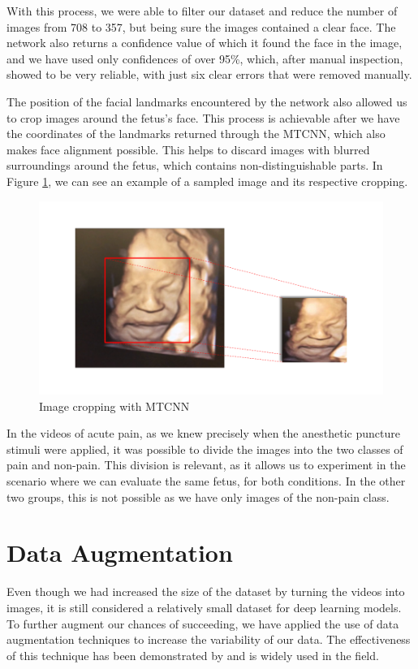 With this process, we were able to filter our dataset and reduce the number of images from 708 to 357, but being sure the images contained a clear face. The network also returns a confidence value of which it found the face in the image, and we have used only confidences of over 95\%, which, after manual inspection, showed to be very reliable, with just six clear errors that were removed manually.

The position of the facial landmarks encountered by the network also allowed us to crop images around the fetus's face. This process is achievable after we have the coordinates of the landmarks returned through the MTCNN, which also makes face alignment possible. This helps to discard images with blurred surroundings around the fetus, which contains non-distinguishable parts. In Figure \ref{fig:cropping}, we can see an example of a sampled image and its respective cropping.

\begin{figure}[h!tp]
    \centering
    \includegraphics[width=.7\textwidth]{imgs/chap5_cropping.png}
    \caption{Image cropping with MTCNN}
    \label{fig:cropping}
\end{figure}

In the videos of acute pain, as we knew precisely when the anesthetic puncture stimuli were applied, it was possible to divide the images into the two classes of pain and non-pain. This division is relevant, as it allows us to experiment in the scenario where we can evaluate the same fetus, for both conditions. In the other two groups, this is not possible as we have only images of the non-pain class.

\section{Data Augmentation}

Even though we had increased the size of the dataset by turning the videos into images, it is still considered a relatively small dataset for deep learning models. To further augment our chances of succeeding, we have applied the use of data augmentation techniques to increase the variability of our data. The effectiveness of this technique has been demonstrated by \cite{abs-1712-04621} and is widely used in the field.


